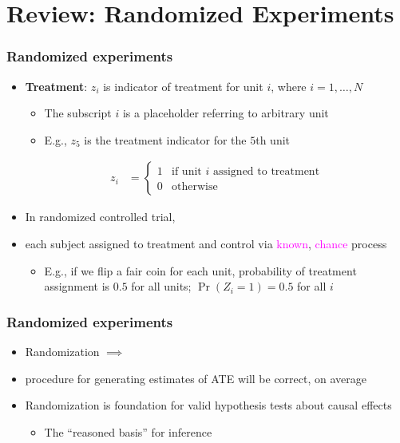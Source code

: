 \documentclass[table, xcolor = {dvipsnames}, 9pt]{beamer}
\theoremstyle{plain}
\begin{document}
\section{Review: Randomized Experiments}
\begin{frame}[t]
\frametitle{Randomized experiments}
\vfill
\begin{itemize} \vfill
\item \textbf{Treatment}: $z_i$ is indicator of treatment for unit $i$, where $i = 1, \ldots, N$ \vfill
\begin{itemize} \vfill
\item The subscript $i$ is a placeholder referring to arbitrary unit \vfill
\item E.g., $z_5$ is the treatment indicator for the $5$th unit \vfill
\end{itemize} \vfill
\begin{align*}
z_i & = 
\begin{cases}
1 & \text{if unit } i \text{ assigned to treatment} \\
0 & \text{otherwise}
\end{cases}
\end{align*} \vfill
\item In randomized controlled trial, \vfill 
\item[] each subject assigned to treatment and control via \textcolor{magenta}{known}, \textcolor{magenta}{chance} process \vfill
\begin{itemize} \vfill
\item E.g., if we flip a fair coin for each unit, probability of treatment assignment is $0.5$ for all units; $\Pr\left(Z_i = 1\right) = 0.5$ for all $i$
\end{itemize} \vfill
\end{itemize}
\vfill
\end{frame}
\begin{frame}[t]
\frametitle{Randomized experiments}
\vfill
\begin{itemize} \vfill
\item Randomization $\implies$ \vfill
\item[] procedure for generating estimates of ATE will be correct, on average \vfill
\item Randomization is foundation for valid hypothesis tests about causal effects \vfill
\begin{itemize} \vfill
\item The ``reasoned basis'' for inference \small \citep[][p.~14]{fisher1935a} \normalsize \vfill
\end{itemize} \vfill
\end{itemize}
\vfill
\end{frame}
\end{document}
